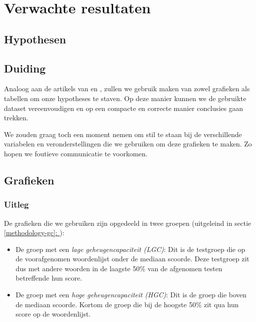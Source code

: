 \documentclass{hogent-article}
\newcommand{\customref}[1]{\underline{\ref{#1}: \nameref{#1}}}
\begin{document}
\section{Verwachte resultaten}
\subsection{Hypothesen}
\subsection{Duiding}

Analoog aan de artikels van \cite{HenryRoediger2006} en \cite{Agarwal2008}, zullen we gebruik maken van zowel grafieken als tabellen om onze hypotheses te staven. Op deze manier kunnen we de gebruikte dataset vereenvoudigen en op een compacte en correcte manier conclusies gaan trekken.\\
\par
\noindent
We zouden graag toch een moment nemen om stil te staan bij de verschillende variabelen en veronderstellingen die we gebruiken om deze grafieken te maken. Zo hopen we foutieve communicatie te voorkomen.

\subsection{Grafieken}
\subsubsection{Uitleg}
De grafieken die we gebruiken zijn opgedeeld in twee groepen (uitgeleind in sectie \customref{methodology-gc}):
\begin{itemize}
	\item De groep met een \textit{lage geheugencapaciteit (LGC)}: Dit is de testgroep die op de voorafgenomen woordenlijst onder de mediaan scoorde. Deze testgroep zit dus met andere woorden in de laagste 50\% van de afgenomen testen betreffende hun score.
	\item De groep met een \textit{hoge geheugencapaciteit (HGC)}: Dit is de groep die boven de mediaan scoorde. Kortom de groep die bij de hoogste 50\% zit qua hun score op de woordenlijst.
\end{itemize}
\end{document}
